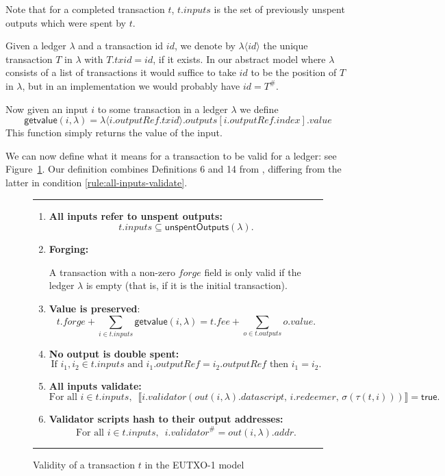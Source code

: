 \documentclass[a4paper]{article}
\newcounter{note}
\newcommand\rfskip{7pt}
\newenvironment{ruledfigure}[1]{\begin{figure}[#1]\hrule\vspace{\rfskip}}{\vspace{\rfskip}\hrule\end{figure}}
\newcommand{\true}{\textsf{true}}
\newcommand{\mi}[1]{\ensuremath{\mathit{#1}}}
\newcommand{\txid}{\mi{txid}}
\newcommand{\idx}{\mi{index}}
\newcommand{\inputs}{\mi{inputs}}
\newcommand{\outputs}{\mi{outputs}}
\newcommand{\forge}{\mi{forge}}
\newcommand{\fee}{\mi{fee}}
\newcommand{\addr}{\mi{addr}}
\newcommand{\val}{\mi{value}}  %
\newcommand{\validator}{\mi{validator}}
\newcommand{\redeemer}{\mi{redeemer}}
\newcommand{\datascript}{\mi{datascript}}
\newcommand{\outputref}{\mi{outputRef}}
\newcommand{\txout}{\mi{out}}
\newcommand{\id}{\mi{id}}
\newcommand{\getvalue}{\msf{getvalue}}
\newcommand{\msf}[1]{\ensuremath{\mathsf{#1}}}
\newcommand{\unspent}{\msf{unspentOutputs}}
\begin{document}
\noindent Note that for a completed transaction $t$, $t.\inputs$ is
the set of previously unspent outputs which were spent by $t$.

\medskip
\noindent Given a ledger $\lambda$ and a transaction id $\id$, we
denote by $\lambda\langle\id\rangle$ the unique transaction $T$ in
$\lambda$ with $T.\txid = \id$, if it exists. In our abstract model
where $\lambda$ consists of a list of transactions it would suffice to
take $id$ to be the position of $T$ in $\lambda$, but in an
implementation we would probably have $id = T^{\#}$.

\medskip
\noindent Now given an input $i$ to some transaction in a ledger
$\lambda$ we define
$$
\getvalue(i,\lambda) = \lambda\langle i.\outputref.\txid \rangle.\outputs[i.\outputref.\idx].\val
$$
This function simply returns the value of the input.



\bigskip

\noindent We can now define what it means for a transaction to be
valid for a ledger: see Figure~\ref{fig:eutxo-1-validity}.  Our
definition combines Definitions 6 and 14 from
\citep{Zahnentferner18-UTxO}, differing from the latter in condition
\ref{rule:all-inputs-validate}.


\begin{ruledfigure}{H}
\begin{enumerate}
    \item \label{rule:all-inputs-refer-to-unspent-outputs} \textbf{All
      inputs refer to unspent outputs:}
      \[
        t.\inputs \subseteq \unspent(\lambda).
      \]
    \item\label{rule:forging} \textbf{Forging:}
      \begin{center}
        \parbox{0.8\textwidth}{ A transaction with a non-zero \forge{}
          field is only valid if the ledger $\lambda$ is empty (that
          is, if it is the initial transaction).}
    \end{center}
      
    \item \label{rule:value-is-preserved} \textbf{Value is preserved}:
    \[
      t.\forge + \sum_{i \in t.\inputs} \getvalue(i, \lambda) = t.\fee + \sum_{o \in t.\outputs} o.\val.
    \]
    \item \label{rule:no-double-spending} \textbf{No output is double spent:}
    \[
     \textrm{If } i_1, i_2 \in t.\inputs \textrm{ and }  i_1.\mathit{outputRef} = i_2.\mathit{outputRef}
     \textrm{ then } i_1 = i_2.
    \]
    \item\label{rule:all-inputs-validate} \textbf{All inputs validate:}
    \[
    \textrm{For all } i \in t.\inputs,\enspace \llbracket
    i.\validator(\txout(i, \lambda).\datascript,\, i.\redeemer,\,  \sigma(\tau(t,i))) \rrbracket = \true.
      \]
    \item\label{rule:validator-scripts-hash} \textbf{Validator scripts hash to their output addresses:}
    \[
      \textrm{For all } i \in t.\inputs,\enspace i.\validator^{\#} = \txout(i, \lambda).\addr.
    \]
\end{enumerate}
\caption{Validity of a transaction $t$ in the EUTXO-1 model}
\label{fig:eutxo-1-validity}
\end{ruledfigure}
\end{document}
